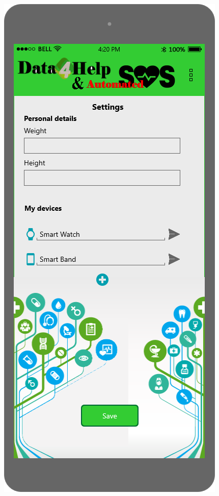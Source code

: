 \begin{figure}
 	\begin{minipage}[b]{0.25\textwidth}
    		\includegraphics[width=\textwidth]{./pictures/settings.png}

\end{minipage}
\end{figure}
